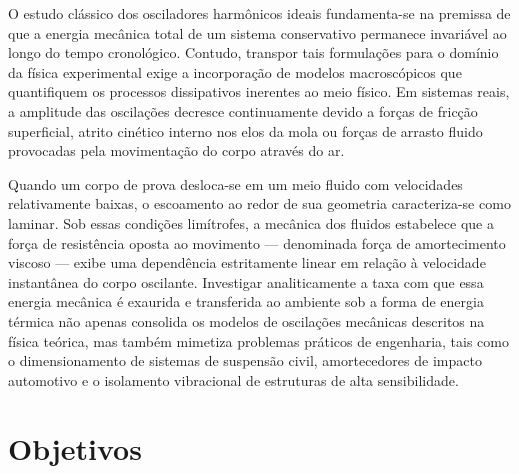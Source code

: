 \documentclass[12pt, a4paper]{article}
\begin{document}
O estudo clássico dos osciladores harmônicos ideais fundamenta-se na premissa de que a energia mecânica total de um sistema conservativo permanece invariável ao longo do tempo cronológico. Contudo, transpor tais formulações para o domínio da física experimental exige a incorporação de modelos macroscópicos que quantifiquem os processos dissipativos inerentes ao meio físico. Em sistemas reais, a amplitude das oscilações decresce continuamente devido a forças de fricção superficial, atrito cinético interno nos elos da mola ou forças de arrasto fluido provocadas pela movimentação do corpo através do ar.

Quando um corpo de prova desloca-se em um meio fluido com velocidades relativamente baixas, o escoamento ao redor de sua geometria caracteriza-se como laminar. Sob essas condições limítrofes, a mecânica dos fluidos estabelece que a força de resistência oposta ao movimento --- denominada força de amortecimento viscoso --- exibe uma dependência estritamente linear em relação à velocidade instantânea do corpo oscilante. Investigar analiticamente a taxa com que essa energia mecânica é exaurida e transferida ao ambiente sob a forma de energia térmica não apenas consolida os modelos de oscilações mecânicas descritos na física teórica, mas também mimetiza problemas práticos de engenharia, tais como o dimensionamento de sistemas de suspensão civil, amortecedores de impacto automotivo e o isolamento vibracional de estruturas de alta sensibilidade.

\section{Objetivos}
\end{document}
